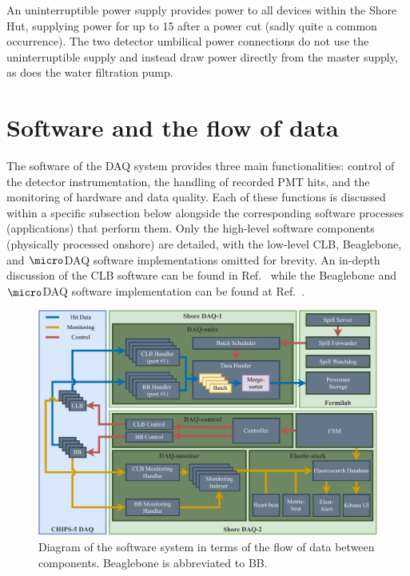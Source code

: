 An uninterruptible power supply provides power to all devices within the Shore Hut, supplying
power for up to \unit{15}{} after a power cut (sadly quite a common occurrence). The
two detector umbilical power connections do not use the uninterruptible supply and instead draw
power directly from the master supply, as does the water filtration pump.

\section{Software and the flow of data} %
\label{sec:daq_soft} %

The software of the \chipsfive DAQ system provides three main functionalities: control of the
detector instrumentation, the handling of recorded PMT hits, and the monitoring of hardware and
data quality. Each of these functions is discussed within a specific subsection below alongside
the corresponding software processes (applications) that perform them. Only the high-level
software components (physically processed onshore) are detailed, with the low-level CLB,
Beaglebone, and $\micro$DAQ software implementations omitted for brevity. An in-depth discussion
of the CLB software can be found in Ref.~\cite{aiello2019} while the Beaglebone and $\micro$DAQ
software implementation can be found at Ref.~\cite{microdaq2020}.

\begin{figure} %
    \includegraphics[width=\textwidth]{diagrams/5-daq/daq_software.pdf}
    \caption[Diagram of the \chipsfive software system in terms of the flow of data between
    components] {Diagram of the \chipsfive software system in terms of the flow of data between
    components. Beaglebone is abbreviated to BB.}
    \label{fig:daq_software}
\end{figure}

